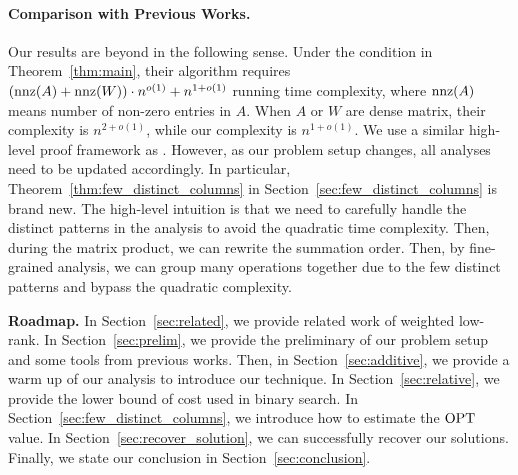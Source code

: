 \paragraph{Comparison with Previous Works. }
Our results are beyond \cite{rsw16} in the following sense. Under the condition in Theorem~\ref{thm:main}, their algorithm requires $(\operatorname{nnz}(A) + \operatorname{nnz}(W )) \cdot n^{o(1)} +
n^{1+o(1)}$ running time complexity, where $\operatorname{nnz}(A)$ means number of non-zero entries in $A$.  When $A$ or $W$ are dense matrix, their complexity is $n^{2+o(1)}$, while our complexity is $n^{1+o(1)}$. 
We use a similar high-level proof framework as \cite{rsw16}. However, as our problem setup changes, all analyses need to be updated accordingly. In particular, Theorem~\ref{thm:few_distinct_columns} in Section~\ref{sec:few_distinct_columns} is brand new.
The high-level intuition is that we need to carefully handle the distinct patterns in the analysis to avoid the quadratic time complexity. Then, during the matrix product, we can rewrite the summation order. Then, by fine-grained analysis, we can group many operations together due to the few distinct patterns and bypass the quadratic complexity.



{\bf Roadmap.} 
In Section~\ref{sec:related}, we provide related work of weighted low-rank. In Section~\ref{sec:prelim}, we provide the preliminary of our problem setup and some tools from previous works. Then, in Section~\ref{sec:additive}, we provide a warm up of our analysis to introduce our technique. 
In Section~\ref{sec:relative}, we provide the lower bound of cost used in binary search. 
In Section~\ref{sec:few_distinct_columns}, we introduce how to estimate the $\operatorname{OPT}$ value. 
In Section~\ref{sec:recover_solution}, we can successfully recover our solutions. 
Finally, we state our conclusion in Section~\ref{sec:conclusion}.